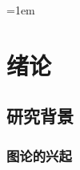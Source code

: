 
\ifx\atempxetex\usewhat
\fi


\titleformat{\chapter}[hang]{\xiaosan\bf\raggedright\song\sf\boldmath}{\xiaoer\chaptertitlename}{18pt}{\xiaosan}
\titlespacing{\chapter}{0pt}{8pt}{16pt}

\makeatletter
\newskip\@footindent
\@footindent=1em

\renewcommand\footnoterule{\kern-3\p@ \hrule width 0.4\columnwidth \kern 2.6\p@}

\long{}

\renewcommand\thefootnote{\pinumber{\arabic{footnote}}}
\def\@makefnmark{\hbox{\textsuperscript{\@thefnmark}}}

\newcommand\pinumber[1]{\ifcase#1 \or \ding{172}\or \ding{173}\or
  \ding{174}\or \ding{175}\or \ding{176}\or \ding{177}%
  \or \ding{178}\or \ding{179}\or \ding{180}\or \ding{181}\else *\fi\relax}
\makeatother

\chapter{绪论}
\label{cha1:introduction}


\section{研究背景}
\label{sec1:background}

\subsection{图论的兴起}
\label{subsec1:graph_theory}



